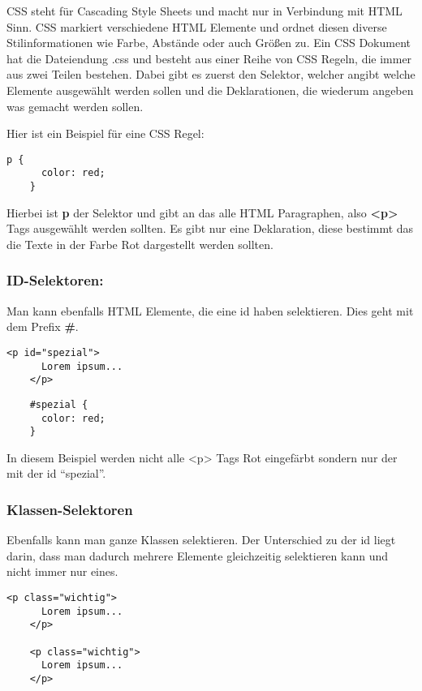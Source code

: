 CSS steht für Cascading Style Sheets und macht nur in Verbindung mit HTML Sinn. CSS markiert verschiedene HTML Elemente und ordnet diesen diverse Stilinformationen wie Farbe, Abstände oder auch Größen zu. Ein CSS Dokument hat die Dateiendung .css und besteht aus einer Reihe von CSS Regeln, die immer aus zwei Teilen bestehen. Dabei gibt es zuerst den Selektor, welcher angibt welche Elemente ausgewählt werden sollen und die Deklarationen, die wiederum angeben was gemacht werden sollen.

Hier ist ein Beispiel für eine CSS Regel:

\begin{lstlisting}[caption=CSS Regel]
    p {
      color: red;
    }
\end{lstlisting}

Hierbei ist \textbf{p} der Selektor und gibt an das alle HTML Paragraphen, also \textbf{<p>} Tags ausgewählt werden sollten. Es gibt nur eine Deklaration, diese bestimmt das die Texte in der Farbe Rot dargestellt werden sollten.

\subsubsection{ID-Selektoren:}
Man kann ebenfalls HTML Elemente, die eine id haben selektieren. Dies geht mit dem Prefix \textbf{\#}.

\begin{lstlisting}[caption=ID-Selektor]
    <p id="spezial">
      Lorem ipsum...
    </p>
\end{lstlisting}

\begin{lstlisting}
    #spezial {
      color: red;
    }
\end{lstlisting}

In diesem Beispiel werden nicht alle <p> Tags Rot eingefärbt sondern nur der mit der id “spezial”.

\subsubsection{Klassen-Selektoren}
Ebenfalls kann man ganze Klassen selektieren. Der Unterschied zu der id liegt darin, dass man dadurch mehrere Elemente gleichzeitig selektieren kann und nicht immer nur eines.

\begin{lstlisting}[caption=Klassen-Selektor]
    <p class="wichtig">
      Lorem ipsum...
    </p>
    
    <p class="wichtig">
      Lorem ipsum...
    </p>
\end{lstlisting}

